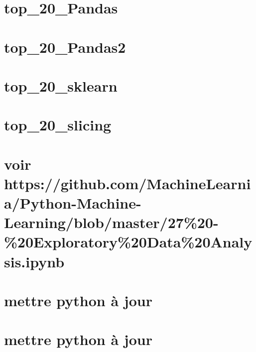 \documentclass[twoside]{book}
\newcommand{\+}{\discretionary{\mbox{\scriptsize$\hookleftarrow$}}{}{}}
\begin{document}
\chapter{top\+\_\+20\+\_\+\+Pandas}
\label{md_base_connaissances_machine_learning_top_20_Pandas}

\chapter{top\+\_\+20\+\_\+\+Pandas2}
\label{md_base_connaissances_machine_learning_top_20_Pandas2}

\chapter{top\+\_\+20\+\_\+sklearn}
\label{md_base_connaissances_machine_learning_top_20_sklearn}

\chapter{top\+\_\+20\+\_\+slicing}
\label{md_base_connaissances_machine_learning_top_20_slicing}

\chapter{voir https\+://github.com/\+Machine\+Learnia/\+Python-\/\+Machine-\/\+Learning/blob/master/27\%20-\/\%20\+Exploratory\%20\+Data\%20\+Analysis.ipynb}
\label{md_base_connaissances_machine_learning_trucs_6astuces}

\chapter{mettre python à jour}
\label{md_base_connaissances_python_lancement_envi_virtuel_django}

\chapter{mettre python à jour}
\label{md_base_connaissances_python_lancement_envi_virtuel_flask}

\end{document}
